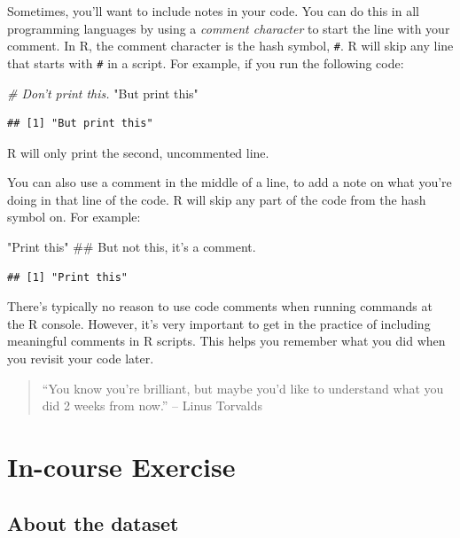 \documentclass[]{book}
\makeatletter
\newenvironment{Shaded}{\begin{snugshade}}{\end{snugshade}}
\newcommand{\StringTok}[1]{\textcolor[rgb]{0.31,0.60,0.02}{#1}}
\newcommand{\CommentTok}[1]{\textcolor[rgb]{0.56,0.35,0.01}{\textit{#1}}}
\newcommand{\NormalTok}[1]{#1}
\newenvironment{kframe}{%
\medskip{}
\setlength{\fboxsep}{.8em}
 \def\at@end@of@kframe{}%
 \ifinner\ifhmode%
  \def\at@end@of@kframe{\end{minipage}}%
  \begin{minipage}{\columnwidth}%
 \fi\fi%
 \def\FrameCommand##1{\hskip\@totalleftmargin \hskip-\fboxsep
 \colorbox{shadecolor}{##1}\hskip-\fboxsep
     \hskip-\linewidth \hskip-\@totalleftmargin \hskip\columnwidth}%
 \MakeFramed {\advance\hsize-\width
   \@totalleftmargin\z@ \linewidth\hsize
   \@setminipage}}%
 {\par\unskip\endMakeFramed%
 \at@end@of@kframe}
\renewenvironment{Shaded}{\begin{kframe}}{\end{kframe}}
\theoremstyle{definition}
\theoremstyle{definition}
\theoremstyle{definition}
\theoremstyle{remark}
\makeatother
\begin{document}
Sometimes, you'll want to include notes in your code. You can do this in
all programming languages by using a \emph{comment character} to start
the line with your comment. In R, the comment character is the hash
symbol, \texttt{\#}. R will skip any line that starts with \texttt{\#}
in a script. For example, if you run the following code:

\begin{Shaded}
\begin{Highlighting}[]
\CommentTok{# Don't print this.}
\StringTok{"But print this"}
\end{Highlighting}
\end{Shaded}

\begin{verbatim}
## [1] "But print this"
\end{verbatim}

R will only print the second, uncommented line.

You can also use a comment in the middle of a line, to add a note on
what you're doing in that line of the code. R will skip any part of the
code from the hash symbol on. For example:

\begin{Shaded}
\begin{Highlighting}[]
\StringTok{"Print this"}\NormalTok{ ## But not this, it's a comment.}
\end{Highlighting}
\end{Shaded}

\begin{verbatim}
## [1] "Print this"
\end{verbatim}

There's typically no reason to use code comments when running commands
at the R console. However, it's very important to get in the practice of
including meaningful comments in R scripts. This helps you remember what
you did when you revisit your code later.

\begin{quote}
``You know you're brilliant, but maybe you'd like to understand what you
did 2 weeks from now.'' -- Linus Torvalds
\end{quote}

\section{In-course Exercise}\label{in-course-exercise}

\subsection{About the dataset}\label{about-the-dataset}
\end{document}
